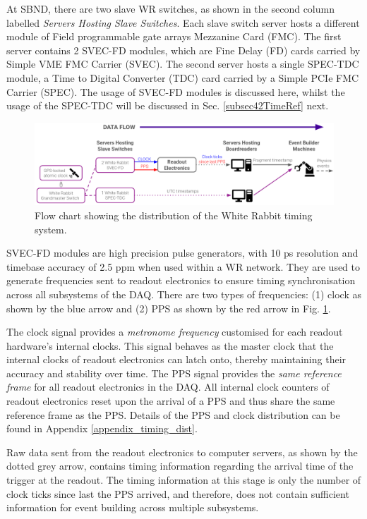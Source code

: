 At SBND, there are two slave WR switches, as shown in the second column labelled \textit{Servers Hosting Slave Switches}.
Each slave switch server hosts a different module of Field programmable gate arrays Mezzanine Card (FMC).
The first server contains 2 SVEC-FD modules, which are Fine Delay (FD) cards carried by Simple VME FMC Carrier (SVEC).
The second server hosts a single SPEC-TDC module, a Time to Digital Converter (TDC) card carried by a Simple PCIe FMC Carrier (SPEC).
The usage of SVEC-FD modules is discussed here, whilst the usage of the SPEC-TDC will be discussed in Sec. \ref{subsec42TimeRef} next.

\begin{figure}[ht!] 
\centering    
\includegraphics[width=1.0\textwidth]{time_transfer}
\caption[White Rabbit Timing System Flow Chart]{
Flow chart showing the distribution of the White Rabbit timing system.
}
\label{fig:timeTransfer}
\end{figure}

SVEC-FD modules are high precision pulse generators, with 10 ps resolution and timebase accuracy of 2.5 ppm when used within a WR network.
They are used to generate frequencies sent to readout electronics to ensure timing synchronisation across all subsystems of the DAQ.
There are two types of frequencies: (1) clock as shown by the blue arrow and (2) PPS as shown by the red arrow in Fig. \ref{fig:timeTransfer}.

The clock signal provides a \textit{metronome frequency} customised for each readout hardware's internal clocks.
This signal behaves as the master clock that the internal clocks of readout electronics can latch onto, thereby maintaining their accuracy and stability over time.
The PPS signal provides the \textit{same reference frame} for all readout electronics in the DAQ.
All internal clock counters of readout electronics reset upon the arrival of a PPS and thus share the same reference frame as the PPS.
Details of the PPS and clock distribution can be found in Appendix \ref{appendix_timing_dist}.

Raw data sent from the readout electronics to computer servers, as shown by the dotted grey arrow, contains timing information regarding the arrival time of the trigger at the readout.
The timing information at this stage is only the number of clock ticks since last the PPS arrived, and therefore, does not contain sufficient information for event building across multiple subsystems.

